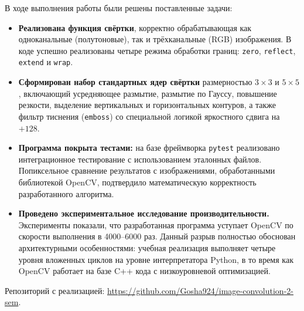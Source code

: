 \documentclass[a4paper]{article}
\begin{document}
В ходе выполнения работы были решены поставленные задачи:
\begin{itemize}
    \item \textbf{Реализована функция свёртки}, корректно обрабатывающая как одноканальные (полутоновые), так и трёхканальные (RGB) изображения. В коде успешно реализованы четыре режима обработки границ: \verb|zero|, \verb|reflect|, \verb|extend| и \verb|wrap|.
    \item \textbf{Сформирован набор стандартных ядер свёртки} размерностью $3 \times 3$ и $5 \times 5$, включающий усредняющее размытие, размытие по Гауссу, повышение резкости, выделение вертикальных и горизонтальных контуров, а также фильтр тиснения (\texttt{emboss}) со специальной логикой яркостного сдвига на $+128$.
    \item \textbf{Программа покрыта тестами:} на базе фреймворка \texttt{pytest} реализовано интеграционное тестирование с использованием эталонных файлов. Попиксельное сравнение результатов с изображениями, обработанными библиотекой OpenCV, подтвердило математическую корректность разработанного алгоритма.
    \item \textbf{Проведено экспериментальное исследование производительности.} Эксперименты показали, что разработанная программа уступает OpenCV по скорости выполнения в 4000--6000 раз. Данный разрыв полностью обоснован архитектурными особенностями: учебная реализация выполняет четыре уровня вложенных циклов на уровне интерпретатора Python, в то время как OpenCV работает на базе C++ кода с низкоуровневой оптимизацией.
\end{itemize}

Репозиторий с реализацией: \url{https://github.com/Gosha924/image-convolution-2-sem}.
\end{document}
